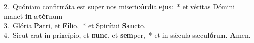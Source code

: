 {2.~}Quóniam confirmáta est super nos miseri\textbf{cór}dia \textbf{e}jus:~* et véritas Dómini manet \textbf{in} æ\textbf{tér}num.\\
{3.~}Glória \textbf{Pa}tri, et \textbf{Fí}lio,~* et Spi\textbf{rí}tui \textbf{San}cto.\\
{4.~}Sicut erat in princípio, et \textbf{nunc}, et \textbf{sem}per,~* et in sǽcula sæcu\textbf{ló}rum. \textbf{A}men.\\
